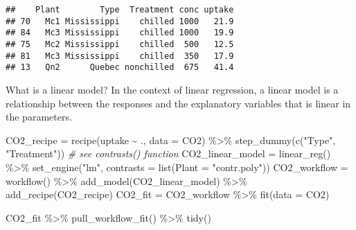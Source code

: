 \documentclass[
]{book}
\newenvironment{Shaded}{\begin{snugshade}}{\end{snugshade}}
\newcommand{\AttributeTok}[1]{\textcolor[rgb]{0.77,0.63,0.00}{#1}}
\newcommand{\CommentTok}[1]{\textcolor[rgb]{0.56,0.35,0.01}{\textit{#1}}}
\newcommand{\FunctionTok}[1]{\textcolor[rgb]{0.00,0.00,0.00}{#1}}
\newcommand{\NormalTok}[1]{#1}
\newcommand{\OtherTok}[1]{\textcolor[rgb]{0.56,0.35,0.01}{#1}}
\newcommand{\SpecialCharTok}[1]{\textcolor[rgb]{0.00,0.00,0.00}{#1}}
\newcommand{\StringTok}[1]{\textcolor[rgb]{0.31,0.60,0.02}{#1}}
\begin{document}
\begin{verbatim}
##    Plant        Type  Treatment conc uptake
## 70   Mc1 Mississippi    chilled 1000   21.9
## 84   Mc3 Mississippi    chilled 1000   19.9
## 75   Mc2 Mississippi    chilled  500   12.5
## 81   Mc3 Mississippi    chilled  350   17.9
## 13   Qn2      Quebec nonchilled  675   41.4
\end{verbatim}

What is a linear model? In the context of linear regression, a linear
model is a relationship between the responses and the explanatory
variables that is linear in the parameters.

\begin{Shaded}
\begin{Highlighting}[]
\NormalTok{CO2\_recipe }\OtherTok{=} \FunctionTok{recipe}\NormalTok{(uptake }\SpecialCharTok{\textasciitilde{}}\NormalTok{ ., }\AttributeTok{data =}\NormalTok{ CO2) }\SpecialCharTok{\%\textgreater{}\%}
    \FunctionTok{step\_dummy}\NormalTok{(}\FunctionTok{c}\NormalTok{(}\StringTok{"Type"}\NormalTok{, }\StringTok{"Treatment"}\NormalTok{))}
\CommentTok{\# see contrasts() function}
\NormalTok{CO2\_linear\_model }\OtherTok{=} \FunctionTok{linear\_reg}\NormalTok{() }\SpecialCharTok{\%\textgreater{}\%}
    \FunctionTok{set\_engine}\NormalTok{(}\StringTok{"lm"}\NormalTok{, }\AttributeTok{contrasts =} \FunctionTok{list}\NormalTok{(}\AttributeTok{Plant =} \StringTok{"contr.poly"}\NormalTok{))}
\NormalTok{CO2\_workflow }\OtherTok{=} \FunctionTok{workflow}\NormalTok{() }\SpecialCharTok{\%\textgreater{}\%}
    \FunctionTok{add\_model}\NormalTok{(CO2\_linear\_model) }\SpecialCharTok{\%\textgreater{}\%}
    \FunctionTok{add\_recipe}\NormalTok{(CO2\_recipe)}
\NormalTok{CO2\_fit }\OtherTok{=}\NormalTok{ CO2\_workflow }\SpecialCharTok{\%\textgreater{}\%}
    \FunctionTok{fit}\NormalTok{(}\AttributeTok{data =}\NormalTok{ CO2)}
\end{Highlighting}
\end{Shaded}

\begin{Shaded}
\begin{Highlighting}[]
\NormalTok{CO2\_fit }\SpecialCharTok{\%\textgreater{}\%}
    \FunctionTok{pull\_workflow\_fit}\NormalTok{() }\SpecialCharTok{\%\textgreater{}\%}
    \FunctionTok{tidy}\NormalTok{()}
\end{Highlighting}
\end{Shaded}
\end{document}
